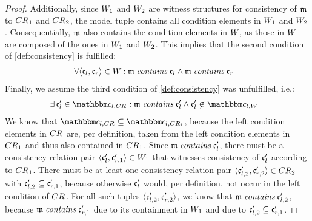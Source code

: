 \begin{proof}
    Additionally, since $\consistencyrelation{W}{1}$ and $\consistencyrelation{W}{2}$ are witness structures for consistency of $\modeltuple{m}$ to $\consistencyrelation{CR}{1}$ and $\consistencyrelation{CR}{2}$, the model tuple contains all condition elements in $\consistencyrelation{W}{1}$ and $\consistencyrelation{W}{2}$.
    Consequentially, $\modeltuple{m}$ also contains the condition elements in $\consistencyrelation{W}{}$, as those in $\consistencyrelation{W}{}$ are composed of the ones in $\consistencyrelation{W}{1}$ and $\consistencyrelation{W}{2}$. This implies that the second condition of \autoref{def:consistency} is fulfilled:
    \begin{align*}
        &
        \forall \tupled{\conditionelement{c}{l}, \conditionelement{c}{r}} \in \consistencyrelation{W}{} : \modeltuple{m} \containsmath \conditionelement{c}{l} \land \modeltuple{m} \containsmath \conditionelement{c}{r}
    \end{align*}
    Finally, we assume the third condition of \autoref{def:consistency} was unfulfilled, i.e.: 
    \begin{align*}
        &
        \exists \conditionelement{c}{l}' \in \condition{c}{l,\consistencyrelation{CR}{}} : \modeltuple{m} \containsmath \conditionelement{c}{l}' \land \conditionelement{c}{l}' \not\in \condition{c}{l,\consistencyrelation{W}{}}
    \end{align*}
    We know that $\condition{c}{l,\consistencyrelation{CR}{}} \subseteq \condition{c}{l,\consistencyrelation{CR}{1}}$, because the left condition elements in $\consistencyrelation{CR}{}$ are, per definition, taken from the left condition elements in $\consistencyrelation{CR}{1}$ and thus also contained in $\consistencyrelation{CR}{1}$.
    Since $\modeltuple{m} \containsmath \conditionelement{c}{l}'$, there must be a consistency relation pair $\tupled{\conditionelement{c}{l}', \conditionelement{c}{r,1}'} \in \consistencyrelation{W}{1}$ that witnesses consistency of $\conditionelement{c}{l}'$ according to $\consistencyrelation{CR}{1}$.
    There must be at least one consistency relation pair $\tupled{\conditionelement{c}{l,2}', \conditionelement{c}{r,2}'} \in \consistencyrelation{CR}{2}$ with $\conditionelement{c}{l,2}' \subseteq \conditionelement{c}{r,1}'$, because otherwise $\conditionelement{c}{l}'$ would, per definition, not occur in the left condition of $\consistencyrelation{CR}{}$.
    For all such tuples $\tupled{\conditionelement{c}{l,2}', \conditionelement{c}{r,2}'}$, we know that $\modeltuple{m} \containsmath \conditionelement{c}{l,2}'$, because $\modeltuple{m} \containsmath \conditionelement{c}{r,1}'$ due to its containment in $\consistencyrelation{W}{1}$ and due to $\conditionelement{c}{l,2}' \subseteq \conditionelement{c}{r,1}'$.

\end{proof}
